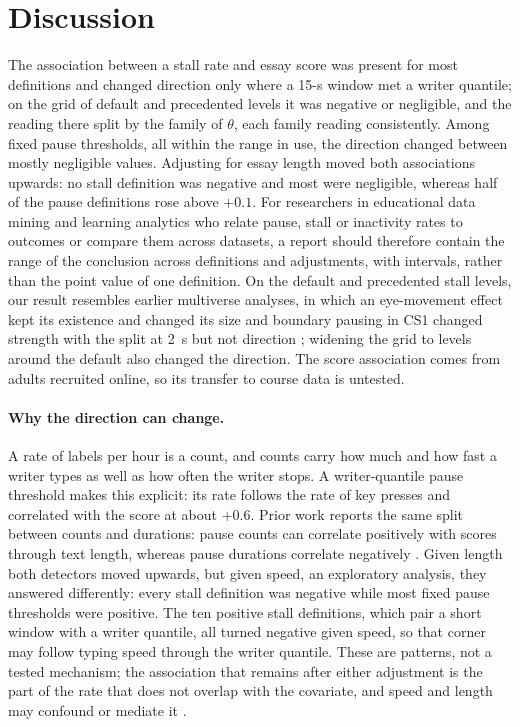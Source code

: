 \section{Discussion}
\label{sec:discussion}

The association between a stall rate and essay score was present for most definitions and changed direction only
where a 15-s window met a writer quantile; on the grid of default and precedented levels it was negative or
negligible, and the reading there split by the family of $\theta$, each family reading consistently. Among fixed pause
thresholds, all within the range in use, the direction changed between mostly negligible values. Adjusting for essay
length moved both associations upwards: no stall definition was negative and most were negligible, whereas half of the
pause definitions rose above $+0.1$. For researchers in educational data mining and learning analytics who relate pause, stall or
inactivity rates to outcomes or compare them across datasets, a report should therefore contain the range of the
conclusion across definitions and adjustments, with intervals, rather than the point value of one definition. On the
default and precedented stall levels, our result resembles earlier multiverse analyses, in which an eye-movement effect
kept its existence and changed its size \cite{godwin2025multiverse} and boundary pausing in CS1 changed strength with
the split at 2~s but not direction \cite{koutcheme2026keystroke}; widening the grid to levels around the default also
changed the direction. The score association comes from adults recruited online, so its transfer to course data is untested.

\paragraph{Why the direction can change.} A rate of labels per hour is a count, and counts carry how much and how fast
a writer types as well as how often the writer stops. A writer-quantile pause threshold makes this explicit: its rate
follows the rate of key presses and correlated with the score at about $+0.6$. Prior work reports the same split
between counts and durations: pause counts can correlate positively with scores through text length, whereas pause
durations correlate negatively \cite{schaller2026keyscore}. Given length both detectors moved upwards, but
given speed, an exploratory analysis, they answered differently: every stall definition was negative while most fixed
pause thresholds were positive. The ten positive stall definitions, which pair a short window with a writer quantile,
all turned negative given speed, so that corner may follow typing speed through the writer quantile. These are
patterns, not a tested mechanism; the association that remains after either adjustment is the part of the rate that
does not overlap with the covariate, and speed and length may confound or mediate it \cite{mackinnon2000equivalence}.

